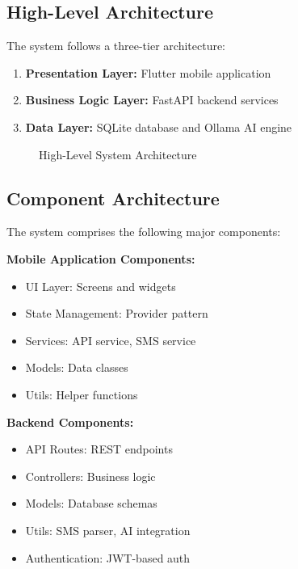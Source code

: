 \documentclass[11pt,a4paper]{report}
\begin{document}
\subsection{High-Level Architecture}

The system follows a three-tier architecture:

\begin{enumerate}
    \item \textbf{Presentation Layer:} Flutter mobile application
    \item \textbf{Business Logic Layer:} FastAPI backend services
    \item \textbf{Data Layer:} SQLite database and Ollama AI engine
\end{enumerate}

\begin{figure}[htbp]
    \centering
    \caption{High-Level System Architecture}
    \label{fig:architecture}
\end{figure}

\subsection{Component Architecture}

The system comprises the following major components:

\textbf{Mobile Application Components:}
\begin{itemize}
    \item UI Layer: Screens and widgets
    \item State Management: Provider pattern
    \item Services: API service, SMS service
    \item Models: Data classes
    \item Utils: Helper functions
\end{itemize}

\textbf{Backend Components:}
\begin{itemize}
    \item API Routes: REST endpoints
    \item Controllers: Business logic
    \item Models: Database schemas
    \item Utils: SMS parser, AI integration
    \item Authentication: JWT-based auth
\end{itemize}
\end{document}
